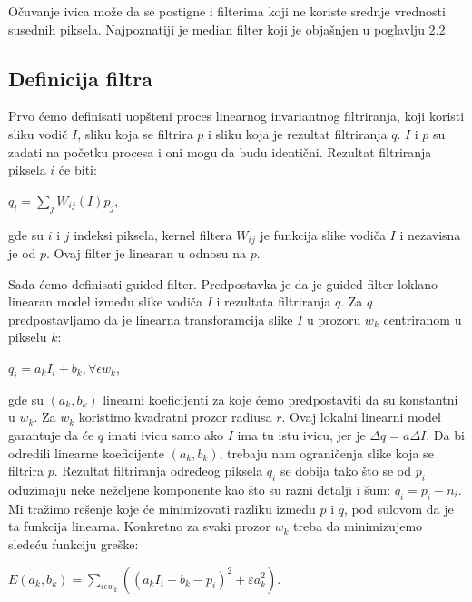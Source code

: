 \documentclass[a4paper,12pt,titlepage]{article}
\begin{document}
Očuvanje ivica može da se postigne i filterima koji ne koriste srednje vrednosti susednih piksela. Najpoznatiji je median filter koji je objašnjen u poglavlju 2.2.           

\subsection{Definicija filtra}%

Prvo ćemo definisati uopšteni proces linearnog invariantnog filtriranja, koji koristi sliku vodič $I$, sliku koja se filtrira $p$ i sliku koja je rezultat filtriranja $q$. $I$ i $p$ su zadati na početku procesa i oni mogu da budu identični. Rezultat filtriranja piksela $i$ će biti: 

\begin{center}
	$q_i = \sum_{j} W_{ij}(I)p_j$,
\end{center}

gde su $i$ i $j$ indeksi piksela, kernel filtera $W_{ij}$ je funkcija slike vodiča $I$ i nezavisna je od $p$. Ovaj filter je linearan u odnosu na $p$. 

Sada ćemo definisati guided filter. Predpostavka je da je guided filter loklano linearan model između slike vodiča $I$ i rezultata filtriranja $q$. Za $q$ predpostavljamo da je linearna transforamcija slike $I$ u prozoru $w_k$ centriranom u pikselu $k$:

\begin{center}
	$q_i = a_kI_i + b_k, \forall \epsilon w_k$,
\end{center}

gde su $(a_k, b_k)$ linearni koeficijenti za koje ćemo predpostaviti da su konstantni u $w_k$. Za $w_k$ koristimo kvadratni prozor radiusa $r$. Ovaj lokalni linearni model garantuje da će $q$ imati ivicu samo ako $I$ ima tu istu ivicu, jer je $\Delta q = a\Delta I$. Da bi odredili linearne koeficijente $(a_k, b_k)$, trebaju nam ograničenja slike koja se filtrira $p$. Rezultat filtriranja određeog piksela $q_i$ se dobija tako što se od $p_i$ oduzimaju neke neželjene komponente kao što su razni detalji i šum: $q_i = p_i - n_i$. Mi tražimo rešenje koje će minimizovati razliku između $p$ i $q$, pod sulovom da je ta funkcija linearna. Konkretno za svaki prozor $w_k$ treba da minimizujemo sledeću funkciju greške:

\begin{center}
	$E(a_k, b_k) = \sum_{i \epsilon w_k} ((a_kI_i + b_k - p_i)^2 + \varepsilon a_k^2)$.
\end{center}
\end{document}
